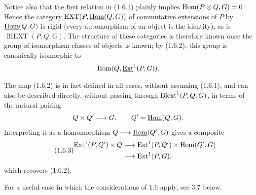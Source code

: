Notice also that the first relation in (1.6.1) plainly implies
$\operatorname{Hom}(P\otimes Q,G)=0$.  Hence the category
$\operatorname{EXT}(P,\uHom(Q,G))$ of commutative extensions of $P$
by $\uHom(Q,G)$ is rigid (every automorphism of an object is the
identity), as is $\operatorname{BIEXT}(P,Q;G)$.  The structure of
these categories is therefore known once the group of isomorphism
classes of objects is known; by (1.6.2), this group is canonically
isomorphic to
\[
 \Hom(Q,\uExt^1(P,G)).
\]

The map (1.6.2) is in fact defined in all cases, without assuming
(1.6.1), and can also be described directly, without passing through
$\operatorname{Biext}^1(P,Q;G)$, in terms of the natural pairing
\[
 Q\times Q'\longrightarrow G,
\qquad Q'=\uHom(Q,G).
\]
Interpreting it as a homomorphism
$Q\longrightarrow\uHom(Q',G)$ gives a composite
\begin{equation}\tag{1.6.3}
\begin{split}
 \operatorname{Ext}^1(P,Q')\times Q
 &\longrightarrow
 \operatorname{Ext}^1(P,Q')\times\operatorname{Hom}(Q',G)\\
 &\longrightarrow
 \operatorname{Ext}^1(P,G),
\end{split}
\end{equation}
which recovers (1.6.2).

For a useful case in which the considerations of 1.6 apply, see 3.7
below.
